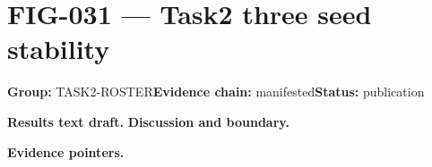 \clearpage
\section{FIG-031 --- Task2 three seed stability}
\label{figpage:fig-031}
\textbf{Group:} TASK2-ROSTER\quad \textbf{Evidence chain:} manifested\quad \textbf{Status:} publication

\textbf{Results text draft.} 
\textbf{Discussion and boundary.} 


\textbf{Evidence pointers.}



\vfill

